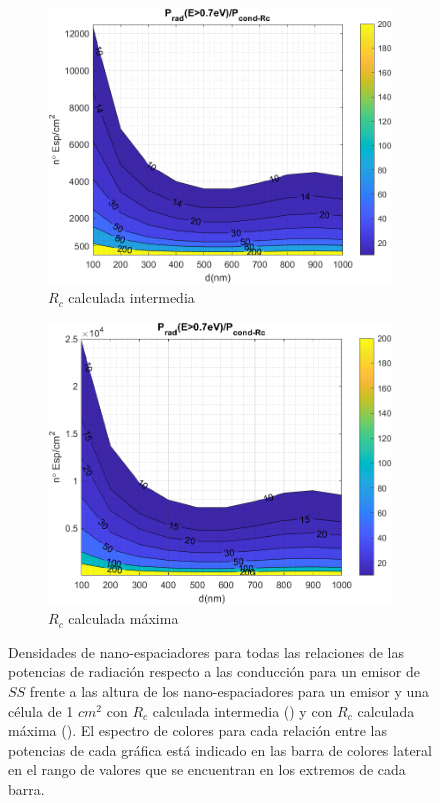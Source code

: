\begin{figure}[H]
	\centering
	\begin{subfigure}[b]{0.49\textwidth}
		\centering
			\includegraphics[width=1.00\textwidth]{figuras/Resultados/RelacionCondRad/SS_Rc_Intermedio.png}
		\caption{$R_c$ calculada intermedia}
		\label{fig:rel_SsSiO2Ge_Rc_inter}
	\end{subfigure}
	\hfill	
	\begin{subfigure}[b]{0.49\textwidth}
		\centering
			\includegraphics[width=1.00\textwidth]{figuras/Resultados/RelacionCondRad/SS_Rc.png}
		\caption{$R_c$ calculada máxima}
		\label{fig:rel_SsSiO2Ge_Rc_max}
	\end{subfigure}
	\caption{Densidades de nano-espaciadores para todas las relaciones de las potencias de radiación respecto a las conducción para un emisor de $SS$ frente a las altura de los nano-espaciadores para un emisor y una célula de 1 $cm^2$ con $R_c$ calculada intermedia () y con $R_c$ calculada máxima (). El espectro de colores para cada relación entre las potencias de cada gráfica está indicado en las barra de colores lateral en el rango de valores que se encuentran en los extremos de cada barra.}
	\label{fig:rels_SsSiO2Ge_Prc1vsPrc2}
\end{figure}
